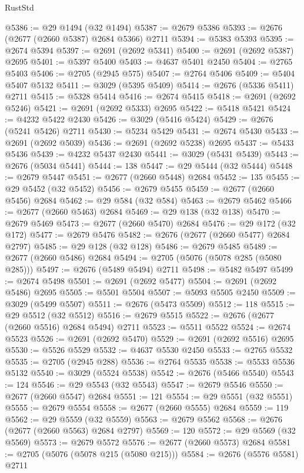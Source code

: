 \begin{lexlean}{RustStd}
\begin{coremodule}
@5386 := @29 @1494 (@32 @1494)
@5387 := @2679 @5386
@5393 := @2676 (@2677 (@2660 @5387) @2684 @5366) @2711
@5394 := @5383 @5393
@5395 := @2674 @5394
@5397 := @2691 (@2692 @5341)
@5400 := @2691 (@2692 @5387) @2695
@5401 := @5397 @5400
@5403 := @4637 @5401 @2450
@5404 := @2765 @5403
@5406 := @2705 (@2945 @575)
@5407 := @2764 @5406
@5409 := @5404 @5407 @5132
@5411 := @3029 (@5395 @5409)
@5414 := @2676 (@5336 @5411) @2711
@5415 := @5328 @5414
@5416 := @2674 @5415
@5418 := @2691 (@2692 @5246)
@5421 := @2691 (@2692 @5333) @2695
@5422 := @5418 @5421
@5424 := @4232 @5422 @2430
@5426 := @3029 (@5416 @5424)
@5429 := @2676 (@5241 @5426) @2711
@5430 := @5234 @5429
@5431 := @2674 @5430
@5433 := @2691 (@2692 @5039)
@5436 := @2691 (@2692 @5238) @2695
@5437 := @5433 @5436
@5439 := @4232 @5437 @2430
@5441 := @3029 (@5431 @5439)
@5443 := @2676 (@5034 @5441)
@5444 := 138
@5447 := @29 @5444 (@32 @5444)
@5448 := @2679 @5447
@5451 := @2677 (@2660 @5448) @2684
@5452 := 135
@5455 := @29 @5452 (@32 @5452)
@5456 := @2679 @5455
@5459 := @2677 (@2660 @5456) @2684
@5462 := @29 @584 (@32 @584)
@5463 := @2679 @5462
@5466 := @2677 (@2660 @5463) @2684
@5469 := @29 @138 (@32 @138)
@5470 := @2679 @5469
@5473 := @2677 (@2660 @5470) @2684
@5476 := @29 @172 (@32 @172)
@5477 := @2679 @5476
@5482 := @2676 (@2677 (@2660 @5477) @2684 @2797)
@5485 := @29 @128 (@32 @128)
@5486 := @2679 @5485
@5489 := @2677 (@2660 @5486) @2684
@5494 := @2705 (@5076 (@5078 @285 (@5080 @285)))
@5497 := @2676 (@5489 @5494) @2711
@5498 := @5482 @5497
@5499 := @2674 @5498
@5501 := @2691 (@2692 @5477)
@5504 := @2691 (@2692 @5486) @2695
@5505 := @5501 @5504
@5507 := @5093 @5505 @2450
@5509 := @3029 (@5499 @5507)
@5511 := @2676 (@5473 @5509)
@5512 := 118
@5515 := @29 @5512 (@32 @5512)
@5516 := @2679 @5515
@5522 := @2676 (@2677 (@2660 @5516) @2684 @5494) @2711
@5523 := @5511 @5522
@5524 := @2674 @5523
@5526 := @2691 (@2692 @5470)
@5529 := @2691 (@2692 @5516) @2695
@5530 := @5526 @5529
@5532 := @4637 @5530 @2450
@5533 := @2765 @5532
@5535 := @2705 (@2945 @288)
@5536 := @2764 @5535
@5538 := @5533 @5536 @5132
@5540 := @3029 (@5524 @5538)
@5542 := @2676 (@5466 @5540)
@5543 := 124
@5546 := @29 @5543 (@32 @5543)
@5547 := @2679 @5546
@5550 := @2677 (@2660 @5547) @2684
@5551 := 121
@5554 := @29 @5551 (@32 @5551)
@5555 := @2679 @5554
@5558 := @2677 (@2660 @5555) @2684
@5559 := 119
@5562 := @29 @5559 (@32 @5559)
@5563 := @2679 @5562
@5568 := @2676 (@2677 (@2660 @5563) @2684 @2797)
@5569 := 120
@5572 := @29 @5569 (@32 @5569)
@5573 := @2679 @5572
@5576 := @2677 (@2660 @5573) @2684
@5581 := @2705 (@5076 (@5078 @215 (@5080 @215)))
@5584 := @2676 (@5576 @5581) @2711

\end{coremodule}
\end{lexlean}
